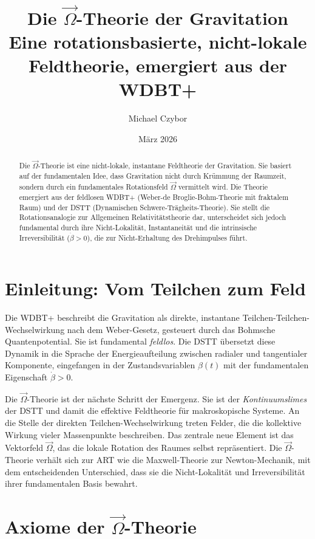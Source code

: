 \documentclass[12pt,a4paper]{article}
\title{\textbf{Die $\vec{\Omega}$-Theorie der Gravitation} \\ \large Eine rotationsbasierte, nicht-lokale Feldtheorie, emergiert aus der WDBT+}
\author{Michael Czybor}
\date{März 2026}
\begin{document}
\maketitle

\begin{abstract}
Die $\vec{\Omega}$-Theorie ist eine nicht-lokale, instantane Feldtheorie der Gravitation. Sie basiert auf der fundamentalen Idee, dass Gravitation nicht durch Krümmung der Raumzeit, sondern durch ein fundamentales Rotationsfeld $\vec{\Omega}$ vermittelt wird. Die Theorie emergiert aus der feldlosen WDBT+ (Weber-de Broglie-Bohm-Theorie mit fraktalem Raum) und der DSTT (Dynamischen Schwere-Trägheits-Theorie). Sie stellt die Rotationsanalogie zur Allgemeinen Relativitätstheorie dar, unterscheidet sich jedoch fundamental durch ihre Nicht-Lokalität, Instantaneität und die intrinsische Irreversibilität ($\dot{\beta} > 0$), die zur Nicht-Erhaltung des Drehimpulses führt.
\end{abstract}

\tableofcontents
\newpage

\section{Einleitung: Vom Teilchen zum Feld}

Die WDBT+ beschreibt die Gravitation als direkte, instantane Teilchen-Teilchen-Wechselwirkung nach dem Weber-Gesetz, gesteuert durch das Bohmsche Quantenpotential. Sie ist fundamental \textit{feldlos}. Die DSTT übersetzt diese Dynamik in die Sprache der Energieaufteilung zwischen radialer und tangentialer Komponente, eingefangen in der Zustandsvariablen $\beta(t)$ mit der fundamentalen Eigenschaft $\dot{\beta} > 0$.

Die $\vec{\Omega}$-Theorie ist der nächste Schritt der Emergenz. Sie ist der \textit{Kontinuumslimes} der DSTT und damit die effektive Feldtheorie für makroskopische Systeme. An die Stelle der direkten Teilchen-Wechselwirkung treten Felder, die die kollektive Wirkung vieler Massenpunkte beschreiben. Das zentrale neue Element ist das Vektorfeld $\vec{\Omega}$, das die lokale Rotation des Raumes selbst repräsentiert. Die $\vec{\Omega}$-Theorie verhält sich zur ART wie die Maxwell-Theorie zur Newton-Mechanik, mit dem entscheidenden Unterschied, dass sie die Nicht-Lokalität und Irreversibilität ihrer fundamentalen Basis bewahrt.

\section{Axiome der $\vec{\Omega}$-Theorie}
\end{document}
